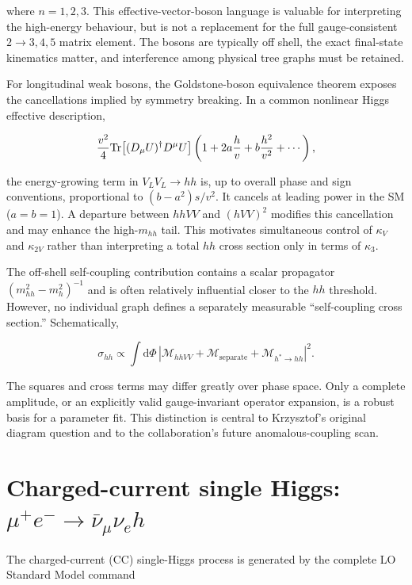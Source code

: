 \documentclass[12pt,a4paper]{article}
\newcommand{\newnote}{\clearpage}
\begin{document}
where $n=1,2,3$. This effective-vector-boson language is valuable for interpreting the high-energy behaviour, but is not a replacement for the full gauge-consistent $2\to3,4,5$ matrix element. The bosons are typically off shell, the exact final-state kinematics matter, and interference among physical tree graphs must be retained.

For longitudinal weak bosons, the Goldstone-boson equivalence theorem exposes the cancellations implied by symmetry breaking. In a common nonlinear Higgs effective description,

\begin{equation}
\frac{v^2}{4}{\rm Tr}\!\left[(D_\mu U)^\dagger D^\mu U\right]
\left(1+2a\frac{h}{v}+b\frac{h^2}{v^2}+\cdots\right),
\end{equation}

the energy-growing term in $V_LV_L\to hh$ is, up to overall phase and sign conventions, proportional to $(b-a^2)s/v^2$. It cancels at leading power in the SM ($a=b=1$). A departure between $hhVV$ and $(hVV)^2$ modifies this cancellation and may enhance the high-$m_{hh}$ tail. This motivates simultaneous control of $\kappa_V$ and $\kappa_{2V}$ rather than interpreting a total $hh$ cross section only in terms of $\kappa_3$.

The off-shell self-coupling contribution contains a scalar propagator $(m_{hh}^2-m_h^2)^{-1}$ and is often relatively influential closer to the $hh$ threshold. However, no individual graph defines a separately measurable ``self-coupling cross section.'' Schematically,

\begin{equation}
\sigma_{hh}\propto\int\mathrm d\Phi\,
\left|\mathcal M_{hhVV}+\mathcal M_{\mathrm{separate}}+\mathcal M_{h^*\to hh}\right|^2.
\end{equation}

The squares and cross terms may differ greatly over phase space. Only a complete amplitude, or an explicitly valid gauge-invariant operator expansion, is a robust basis for a parameter fit. This distinction is central to Krzysztof's original diagram question and to the collaboration's future anomalous-coupling scan.




\newnote

\section{Charged-current single Higgs: $\mu^+e^-\to\bar\nu_\mu\nu_e h$}
The charged-current (CC) single-Higgs process is generated by the complete LO Standard Model command
\end{document}

